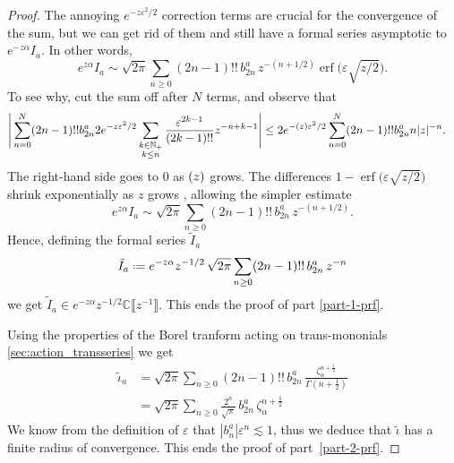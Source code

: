 \documentclass{article}
\let\Re\relax
\DeclareMathOperator{\Re}{Re}
\newcommand{\C}{\mathbb{C}}
\newcommand{\series}[1]{\tilde{#1}}
\newcommand*{\defeq}{\mathrel{\vcenter{\baselineskip0.5ex \lineskiplimit0pt
                     \hbox{\scriptsize.}\hbox{\scriptsize.}}}%
                     =}
\theoremstyle{definition}
\theoremstyle{plain}
\begin{document}
\begin{proof}
The annoying $e^{-z\varepsilon^2/2}$ correction terms are crucial for the convergence of the sum, but we can get rid of them and still have a formal series asymptotic to $e^{-z \alpha} I_a$. In other words,
\[ e^{z \alpha} I_a \sim \sqrt{2\pi} \sum_{n \ge 0} (2n-1)!!\,b_{2n}^a\,z^{-(n+1/2)} \operatorname{erf}\big(\varepsilon \sqrt{z/2}\big). \]
To see why, cut the sum off after $N$ terms, and observe that
\begin{align*}
  \Bigg | \sum_{n= 0}^N(2n-1)!! b_{2n}^a  2e^{-z\varepsilon^2/2} \sum_{\substack{k \in \mathbb{N}_+ \\ k \le n}} \frac{\varepsilon^{2k-1}}{(2k-1)!!} z^{-n+k-1} \Bigg | &\leq  2 e^{-\Re (z) \varepsilon^2/2} \sum_{n=0}^N(2n-1)!! b_{2n}^a n|z|^{-n}.
\end{align*}
The right-hand side goes to $0$ as $\Re(z)$ grows. The differences $1 - \operatorname{erf}\big(\varepsilon \sqrt{z/2}\big)$ shrink exponentially as $z$ grows \cite[inequality~5]{chiani-dardari-book}, allowing the simpler estimate
\[ e^{z\alpha} I_a \sim \sqrt{2\pi} \sum_{n \ge 0} (2n-1)!!\, b_{2n}^a \,z^{-(n+1/2)}. \]
Hence, defining the formal series $\series{I}_a$
\[\series{I}_a \defeq e^{-z\alpha} z^{-1/2}\, \sqrt{2\pi} \sum_{n \ge 0} (2n-1)!!\, b_{2n}^a \,z^{-n}\]
we get $\series{I}_a \in e^{-z\alpha}z^{-1/2}\C\llbracket z^{-1}\rrbracket$. This ends the proof of part \ref{part-1-prf}.

Using the properties of the Borel tranform acting on trans-mononials \ref{sec:action_transseries} we get 
\begin{align*}
\series{\iota}_a & = \sqrt{2\pi} \sum_{n \ge 0} (2n - 1)!! \,b_{2n}^a\,\frac{\zeta_\alpha^{n+\tfrac{1}{2}}}{\Gamma(n+\tfrac{1}{2})} \\
&= \sqrt{2\pi} \sum_{n \ge 0} \frac{2^n}{\sqrt{\pi}} \,b_{2n}^a\,\zeta_\alpha^{n+\tfrac{1}{2}}
\end{align*}
We know from the definition of $\varepsilon$ that $\left|b_n^a\right| \varepsilon^n \lesssim 1$, thus we deduce that $\series{\iota}$ has a finite radius of convergence. This ends the proof of part~\ref{part-2-prf}.


\end{proof}
\end{document}
